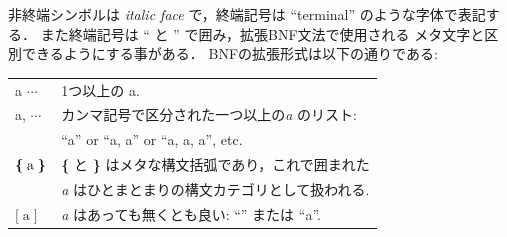 \documentclass[a4paper,oneside,10pt]{memoir}
\def\sym#1{\textsf{#1}\null}
\def\seqof#1{\mbox{\textbf{\{}}\;{#1}\;\mbox{\textbf{\}}}}
\def\optn#1{\textbf{[}\;{#1}\;\textbf{]}}
\begin{document}
非終端シンボルは \textit{italic face} で，終端記号は
``\sym{terminal}'' のような字体で表記する．
また終端記号は `` と '' で囲み，拡張BNF文法で使用される
メタ文字と区別できるようにする事がある．
BNFの拡張形式は以下の通りである:
\begin{center}
\begin{minipage}{0.7\textwidth}
  \begin{tabular}{ll}
    a $\cdots$ & 1つ以上の a. \\
    a, $\cdots$ & カンマ記号で区分された一つ以上の\textit{a} のリスト: \\
    & ``a'' or ``a, a'' or ``a, a, a'', etc. \\
    $\seqof{\textrm{a}}$ & \textbf{\{} と \textbf{\}} はメタな構文括弧であり，これで囲まれた\\
    & \textit{a} はひとまとまりの構文カテゴリとして扱われる. \\
    $\optn{\textrm{a}}$ & \textit{a} はあっても無くとも良い: ``'' または ``a''.
  \end{tabular}
\end{minipage}
\end{center}
\end{document}
